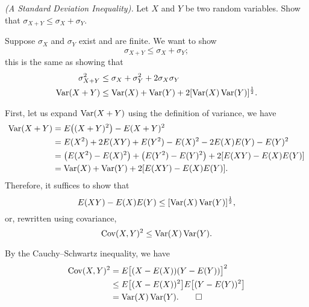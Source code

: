 \begin{problem}[Handout 15, \# 16]
  \emph{(A Standard Deviation Inequality).} Let \(X\) and \(Y\) be two
  random variables. Show that \(\sigma_{X+Y}\leq\sigma_X+\sigma_Y\).
\end{problem}
\begin{solution}
  Suppose \(\sigma_X\) and \(\sigma_Y\) exist and are finite. We want to
  show
  \[
    \sigma_{X+Y}\leq\sigma_X+\sigma_Y;
  \]
  this is the same as showing that
  \begin{align*}
    \sigma_{X+Y}^2
    &\leq\sigma_X+\sigma_Y^2+2\sigma_X\sigma_Y\\
    \operatorname{Var}(X+Y)&\leq\operatorname{Var}(X)+\operatorname{Var}(Y)+2[\operatorname{Var}(X)\operatorname{Var}(Y)]^{\frac{1}{2}}.
  \end{align*}

  First, let us expand \(\operatorname{Var}(X+Y)\) using the definition of variance, we
  have
  \begin{align*}
    \operatorname{Var}(X+Y)
    &=E\bigl((X+Y)^2\bigr)-E(X+Y)^2\\
    &=E(X^2)+2E(XY)+E(Y^2)-E(X)^2-2E(X)E(Y)-E(Y)^2\\
    &=\bigl(E(X^2)-E(X)^2\bigr)+\bigl(E(Y^2)-E(Y)^2\bigr)+2[E(XY)-E(X)E(Y)]\\
    &=\operatorname{Var}(X)+\operatorname{Var}(Y)+2[E(XY)-E(X)E(Y)].
  \end{align*}
  Therefore, it suffices to show that
  \[
    E(XY)-E(X)E(Y)\leq [\operatorname{Var}(X)\operatorname{Var}(Y)]^{\frac{1}{2}},
  \]
  or, rewritten using covariance,
  \[
    \operatorname{Cov}(X,Y)^2\leq\operatorname{Var}(X)\operatorname{Var}(Y).
  \]

  By the Cauchy--Schwartz inequality, we have
  \begin{align*}
    \operatorname{Cov}(X,Y)^2
    &=E\bigl[(X-E(X))(Y-E(Y))\bigr]^2\\
    &\leq E\bigl[(X-E(X))^2\bigr]
      E\bigl[(Y-E(Y))^2\bigr]\\
    &=\operatorname{Var}(X)\operatorname{Var}(Y).\qedhere
  \end{align*}
\end{solution}


